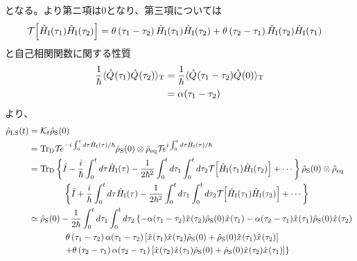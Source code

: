 \documentclass[10pt, a4paper]{jsarticle}
\begin{document}
となる。より第ニ項は$0$となり、第三項については
\begin{equation}
\begin{split}
\label{eq:504}
	\mathcal{T}_{} \left[ \hat{H}_{\rm \rm I}(\tau_{1})\hat{H}_{\rm \rm I}(\tau_{2}) \right] &= \theta \left( \tau_{1} - \tau_{2} \right) \hat{H}_{\rm \rm I}(\tau_{1})\hat{H}_{\rm \rm I}(\tau_{2}) + \theta \left( \tau_{2} - \tau_{1} \right) \hat{H}_{\rm \rm I}(\tau_{2})\hat{H}_{\rm \rm I}(\tau_{1})
\end{split}
\end{equation}
と自己相関関数に関する性質
\begin{equation}
\begin{split}
\label{eq:505}
	\dfrac{1}{\hbar}\langle \hat{Q}_{}(\tau_{1}) \hat{Q}_{}(\tau_{2}) \rangle_{\rm T} &= \dfrac{1}{\hbar}\langle \hat{Q}_{}(\tau_{1} - \tau_{2}) \hat{Q}_{}(0) \rangle_{\rm T} \\
		&= \alpha(\tau_{1} - \tau_{2})
\end{split}
\end{equation}
より、
\begin{equation}
\begin{split}
\label{eq:506}
	\hat{\rho}_{\rm I,S}(t) &= \mathcal{K}_{t} \hat{\rho}_{\rm S}(0) \\
		&= {\rm Tr}_{\rm D}\mathcal{T}_{} e^{- i \int_{0}^{t} d\tau \hat{H}_{\rm \rm I}(\tau) / \hbar} \hat{\rho}_{\rm S}(0) \otimes \hat{\rho}_{\rm eq} \mathcal{T}_{} e^{i \int_{0}^{t} d\tau \hat{H}_{\rm \rm I}(\tau) / \hbar} \\
		&= {\rm Tr}_{\rm D} \left\{ \hat{I}_{\rm } - \dfrac{i}{\hbar} \int_{0}^{t} d\tau \hat{H}_{\rm \rm I}(\tau) - \dfrac{1}{2 \hbar^{2}} \int_{0}^{t} d\tau_{1} \int_{0}^{t} d\tau_{2} \mathcal{T}_{} \left[ \hat{H}_{\rm \rm I}(\tau_{1}) \hat{H}_{\rm \rm I}(\tau_{2}) \right] + \cdots \right\} \hat{\rho}_{\rm S}(0) \otimes \hat{\rho}_{\rm eq} \\
		&\qquad \qquad \left\{ \hat{I}_{\rm } + \dfrac{i}{\hbar} \int_{0}^{t} d\tau \hat{H}_{\rm \rm I}(\tau) - \dfrac{1}{2 \hbar^{2}} \int_{0}^{t} d\tau_{1} \int_{0}^{t} d\tau_{2} \mathcal{T}_{} \left[ \hat{H}_{\rm \rm I}(\tau_{1}) \hat{H}_{\rm \rm I}(\tau_{2}) \right] + \cdots \right\} \\
		&\simeq \hat{\rho}_{\rm S}(0) - \dfrac{1}{2 \hbar} \int_{0}^{t} d\tau_{1} \int_{0}^{t} d\tau_{2} \left\{ - \alpha(\tau_{1} - \tau_{2}) \hat{x}_{}(\tau_{2}) \hat{\rho}_{\rm S}(0) \hat{x}_{}(\tau_{1}) - \alpha(\tau_{2} - \tau_{1}) \hat{x}_{}(\tau_{1}) \hat{\rho}_{\rm S}(0) \hat{x}_{}(\tau_{2}) \right. \\
		&\qquad \qquad \left. \theta \left( \tau_{1} - \tau_{2} \right)\alpha(\tau_{1} - \tau_{2}) \left[ \hat{x}_{}(\tau_{1}) \hat{x}_{}(\tau_{2}) \hat{\rho}_{\rm S}(0) + \hat{\rho}_{\rm S}(0) \hat{x}_{}(\tau_{1}) \hat{x}_{}(\tau_{2}) \right] \right. \\
		&\qquad \qquad \left. + \theta \left( \tau_{2} - \tau_{1} \right)\alpha(\tau_{2} - \tau_{1}) \left[ \hat{x}_{}(\tau_{2}) \hat{x}_{}(\tau_{1}) \hat{\rho}_{\rm S}(0) + \hat{\rho}_{\rm S}(0) \hat{x}_{}(\tau_{2}) \hat{x}_{}(\tau_{1}) \right]\right\}
\end{split}
\end{equation}
\end{document}
